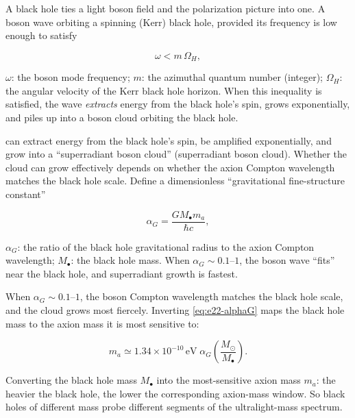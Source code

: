 A black hole ties a light boson field and the polarization picture into one. A boson wave orbiting a spinning (Kerr) black hole, provided its frequency is low enough to satisfy

\begin{equation}
  \omega<m\,\Omega_H,
  \label{eq:e22-superradiance}
\end{equation}
\begin{formulaexplain}
\(\omega\): the boson mode frequency; \(m\): the azimuthal quantum number (integer); \(\Omega_H\): the angular velocity of the Kerr black hole horizon. When this inequality is satisfied, the wave \emph{extracts} energy from the black hole's spin, grows exponentially, and piles up into a boson cloud orbiting the black hole.
\end{formulaexplain}

can extract energy from the black hole's spin, be amplified exponentially, and grow into a ``superradiant boson cloud'' (superradiant boson cloud). Whether the cloud can grow effectively depends on whether the axion Compton wavelength matches the black hole scale. Define a dimensionless ``gravitational fine-structure constant''

\begin{equation}
  \alpha_G=\frac{G M_\bullet m_a}{\hbar c},
  \label{eq:e22-alphaG}
\end{equation}
\begin{formulaexplain}
\(\alpha_G\): the ratio of the black hole gravitational radius to the axion Compton wavelength; \(M_\bullet\): the black hole mass. When \(\alpha_G\sim0.1\text{--}1\), the boson wave ``fits'' near the black hole, and superradiant growth is fastest.
\end{formulaexplain}

When \(\alpha_G\sim0.1\text{--}1\), the boson Compton wavelength matches the black hole scale, and the cloud grows most fiercely. Inverting \eqref{eq:e22-alphaG} maps the black hole mass to the axion mass it is most sensitive to:

\begin{equation}
  m_a\simeq 1.34\times10^{-10}\,\mathrm{eV}\;\alpha_G
  \left(\frac{M_\odot}{M_\bullet}\right).
  \label{eq:e22-bh-mass}
\end{equation}
\begin{formulaexplain}
Converting the black hole mass \(M_\bullet\) into the most-sensitive axion mass \(m_a\): the heavier the black hole, the lower the corresponding axion-mass window. So black holes of different mass probe different segments of the ultralight-mass spectrum.
\end{formulaexplain}

